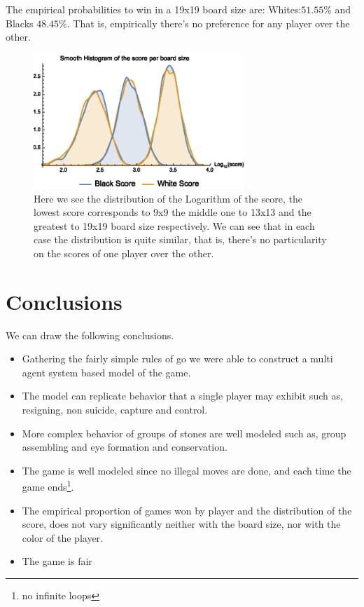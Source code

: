 \documentclass[a4paper,10pt,twocolumn]{article}
\begin{document}
\begin{CJK*}{UTF8}{gbsn}
The empirical probabilities to win in a 19x19 board size are: Whites:$51.55\%$ and Blacks $48.45\%$. That is, empirically there's no preference for any player over the other. 


\begin{figure}[!ht]
\begin{center}
\includegraphics[width=8cm]{r2.eps}
\caption{\footnotesize Here we see the distribution of the Logarithm of the score, the lowest score corresponds to 9x9 the middle one to 13x13 and the greatest to 19x19 board size respectively. We can see that in each case the distribution is quite similar, that is, there's no particularity on the scores of one player over the other.  \label{rr2}}
\end{center}
\end{figure}

\section{Conclusions}
We can draw the following conclusions. 

\begin{itemize}
\item Gathering the fairly simple rules of go we were able to construct a multi agent system based model of the game. 
\item The model can replicate behavior that a single player may exhibit such as, resigning, non suicide, capture and control. 
\item More complex behavior of groups of stones are well modeled such as, group assembling and eye formation and conservation. 
\item The game is well modeled since no illegal moves are done, and each time the game ends\footnote{no infinite loops}. 
\item The empirical proportion of games won by player and the distribution of the score, does not vary significantly neither with the board size, nor with the color of the player. 
\item The game is fair 
\end{itemize}


\end{CJK*}
\end{document}
